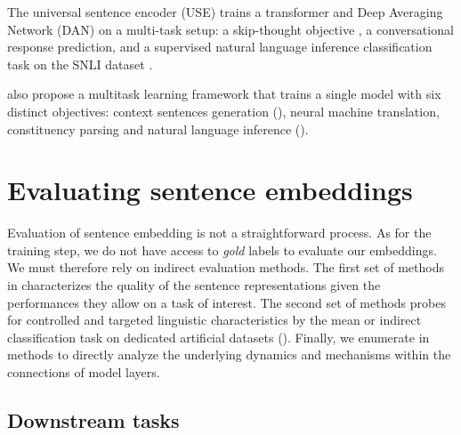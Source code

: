The universal sentence encoder (USE) \parencite{cer_18} trains a transformer and Deep Averaging Network (DAN) on a multi-task setup: a skip-thought objective \parencite{kiros_15}, a conversational response prediction, and a supervised natural language inference classification task on the SNLI dataset \parencite{bowman_15, conneau_17}.

\textcite{subramanian_18} also propose a multitask learning framework that trains a single model with six distinct objectives: context sentences generation (), neural machine translation, constituency parsing and natural language inference ().

\section{Evaluating sentence embeddings}

Evaluation of sentence embedding is not a straightforward process. As for the training step, we do not have access to \textit{gold} labels to evaluate our embeddings. We must therefore rely on indirect evaluation methods. The first set of methods in  characterizes the quality of the sentence representations given the performances they allow on a task of interest. The second set of methods probes for controlled and targeted linguistic characteristics by the mean or indirect classification task on dedicated artificial datasets (). Finally, we enumerate in  methods to directly analyze the underlying dynamics and mechanisms within the connections of model layers.

\subsection{Downstream tasks}

